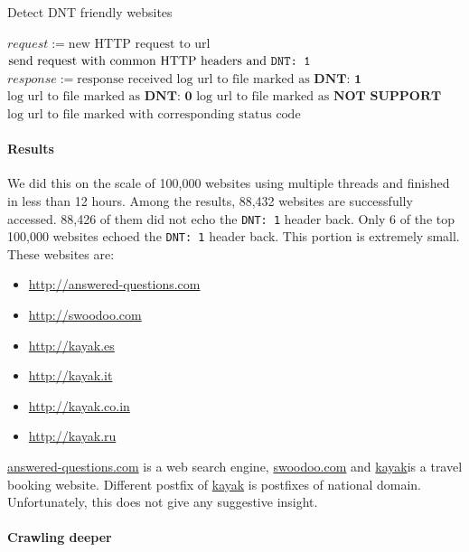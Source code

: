 \documentclass{sig-alternate}
\begin{document}
\begin{algorithm}
\caption{Detect DNT friendly websites}\label{listdiscover}
\begin{algorithmic}
  \State $request := \text{new HTTP request to url}$
  \State $\text{send request with common HTTP headers and }\verb|DNT: 1|$ 
  \State $response := \text{response received}$
      \State $\text{log url to file marked as }\textbf{DNT: 1}$
      \State $\text{log url to file marked as }\textbf{DNT: 0}$
    \Else
      \State $\text{log url to file marked as }\textbf{NOT SUPPORT}$
    \EndIf
  \Else
    \State $\text{log url to file marked with corresponding status code}$
  \EndIf
\EndFor
\end{algorithmic}
\end{algorithm}

\paragraph{Results}
We did this on the scale of 100,000 websites using multiple threads and finished in less than 12 hours. Among the results, 88,432 websites are successfully accessed. 88,426 of them did not echo the \verb|DNT: 1| header back. Only 6 of the top 100,000 websites echoed the \verb|DNT: 1| header back. This portion is extremely small. These websites are:

\begin{itemize}
\item \url{http://answered-questions.com}
\item \url{http://swoodoo.com}
\item \url{http://kayak.es}
\item \url{http://kayak.it}
\item \url{http://kayak.co.in}
\item \url{http://kayak.ru}
\end{itemize}

\url{answered-questions.com} is a web search engine, \url{swoodoo.com} and \url{kayak}is a travel booking website. Different postfix of \url{kayak} is postfixes of national domain. Unfortunately, this does not give any suggestive insight. 

\paragraph{Crawling deeper}
\end{document}

